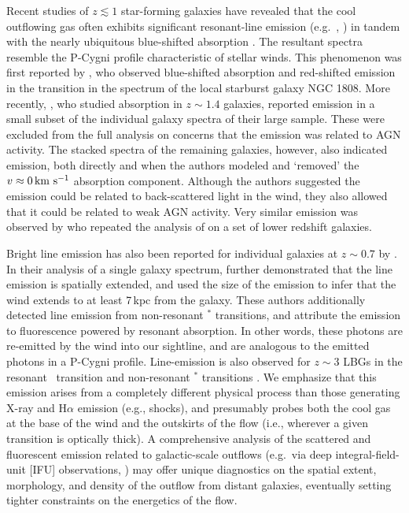 \documentclass[12pt,preprint]{aastex}
\begin{document}
Recent studies of $z \lesssim 1$ star-forming galaxies have revealed that
the cool outflowing gas often exhibits significant resonant-line emission (e.g.\
, ) in
tandem with the nearly ubiquitous blue-shifted absorption
\citep{wcp+09,rwk+10,cth+10}.  The resultant spectra resemble the P-Cygni
profile characteristic of stellar winds.
This phenomenon was first reported by \citet{phillips93}, who observed 
blue-shifted absorption and red-shifted emission in the \ion{Na}{1}
transition in the spectrum of the local starburst galaxy NGC 1808.
More recently, \cite{wcp+09}, who
studied  absorption in $z \sim 1.4$ galaxies, reported
\ion{Mg}{2} emission in a small subset of the individual galaxy
spectra of their large sample.  These were excluded from the full
analysis on concerns that the emission was related to AGN activity.
The stacked spectra of the remaining galaxies, however, also indicated
\ion{Mg}{2} emission, both directly and when the authors modeled and
`removed' the $v \approx 0\, {\rm km~s^{-1}}$ absorption component.  Although the
authors suggested the emission could be related to back-scattered
light in the wind, they also allowed that it could be related to weak
AGN activity.   Very similar \ion{Mg}{2} emission was observed by
\cite{rwk+10} who repeated the analysis of \cite{wcp+09} on a set
of lower redshift galaxies. 

Bright  line emission has also been
reported for individual galaxies at $z \sim 0.7$ by \cite[][see also
Rubin et al\ 2011, in prep.]{rubin+10c}.
In their analysis of a single galaxy spectrum, \cite{rubin+10c}
further demonstrated that the  line emission is spatially
extended, and used the size of the emission to infer that the wind 
extends to at least 7\,kpc from the galaxy.
These authors additionally detected line
emission from non-resonant $^*$ transitions, and attribute
the emission to fluorescence powered by \ion{Fe}{2} resonant
absorption.  In other words, these photons are re-emitted by the wind
into our sightline, and are analogous to the emitted photons in a P-Cygni profile.
Line-emission is
also observed for $z \sim 3$ LBGs in the resonant \lya\ transition
and non-resonant \ion{Si}{2}$^*$ transitions \citep{prs+02,shapley03}.
We emphasize that this emission arises from a completely different
physical process than those generating X-ray and H$\alpha$ emission
(e.g., shocks), and presumably probes both the cool gas at the base of
the wind and the outskirts of the flow (i.e., wherever a given
transition is optically thick).
A comprehensive analysis of the %
scattered and fluorescent emission
related to galactic-scale outflows
(e.g.\ via deep integral-field-unit [IFU] observations,
\citealt{ssb+05,wsg08}) 
may offer unique
diagnostics on the spatial extent, morphology, and density of the outflow 
from distant galaxies,
eventually
setting tighter constraints on the energetics of the flow.   
\end{document}
